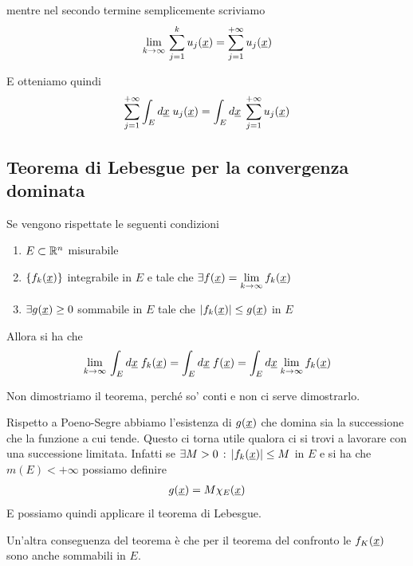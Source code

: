 mentre nel secondo termine semplicemente scriviamo
\begin{align}
	\underset{k \rightarrow \infty}{\lim} \,\sum_{j=1}^{k} u_j(\underline{x}) = \sum_{j=1}^{+\infty} u_j(\underline{x})
\end{align} 

E otteniamo quindi
\begin{align}
	\sum_{j=1}^{+\infty}  \int_{E} d\underline{x} \;  u_j(\underline{x}) = \int_{E} d\underline{x} \; \sum_{j=1}^{+\infty} u_j(\underline{x})
\end{align}

\newpage

\subsection{Teorema di Lebesgue per la convergenza dominata}

Se vengono rispettate le seguenti condizioni
\begin{enumerate}
	\item $E\subset \mathbb{R}^n$ misurabile
	\item $\{ f_k(\underline{x}) \}$ integrabile in $E$ e tale che $\exists f(\underline{x})= \underset{k \rightarrow \infty}{\lim} \, f_k(\underline{x})$
	\item $\exists g(\underline{x}) \geq 0$ sommabile in $E$ tale che $|f_k(\underline{x})| \leq g(\underline{x})$ \qo in $E$
\end{enumerate}

Allora si ha che
\begin{align}
	\underset{k \rightarrow \infty}{\lim} \, \int_{E} d\underline{x} \; f_k(\underline{x})= \int_{E} d\underline{x} \; f(\underline{x})= \int_{E} d\underline{x} \;\underset{k \rightarrow \infty}{\lim} \,  f_k(\underline{x}) 
\end{align}

Non dimostriamo il teorema, perché so' conti e non ci serve dimostrarlo.

\bigskip

Rispetto a Poeno-Segre abbiamo l'esistenza di $g(\underline{x})$ che domina sia la successione che la funzione a cui tende. Questo ci torna utile qualora ci si trovi a lavorare con una successione limitata. Infatti se $\exists M>0 \, : \, |f_k(\underline{x})|\leq M$ \qo in $E$ e si ha che $m(E)< + \infty$ possiamo definire
\begin{align}
	g(\underline{x})= M \chi_E(\underline{x})
\end{align}
E possiamo quindi applicare il teorema di Lebesgue.

\bigskip

Un'altra conseguenza del teorema è che per il teorema del confronto le $f_K(\underline{x})$ sono anche sommabili in $E$.

